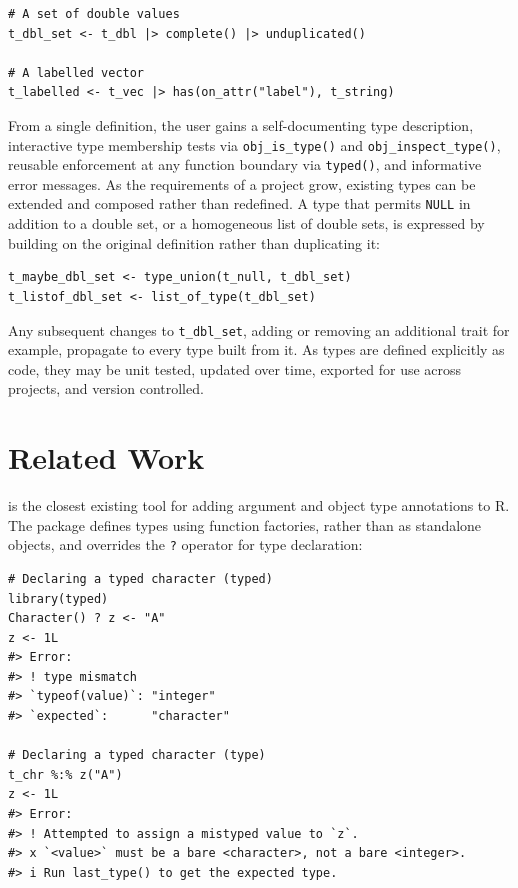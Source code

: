 \begin{verbatim}
# A set of double values
t_dbl_set <- t_dbl |> complete() |> unduplicated()

# A labelled vector
t_labelled <- t_vec |> has(on_attr("label"), t_string)
\end{verbatim}

From a single definition, the user gains a self-documenting type description, interactive type membership tests via \texttt{obj\_is\_type()} and \texttt{obj\_inspect\_type()}, reusable enforcement at any function boundary via \texttt{typed()}, and informative error messages. As the requirements of a project grow, existing types can be extended and composed rather than redefined. A type that permits \texttt{NULL} in addition to a double set, or a homogeneous list of double sets, is expressed by building on the original definition rather than duplicating it:

\begin{verbatim}
t_maybe_dbl_set <- type_union(t_null, t_dbl_set)
t_listof_dbl_set <- list_of_type(t_dbl_set)
\end{verbatim}

Any subsequent changes to \texttt{t\_dbl\_set}, adding or removing an additional trait for example, propagate to every type built from it. As types are defined explicitly as code, they may be unit tested, updated over time, exported for use across projects, and version controlled.

\section{Related Work}\label{sec-related-work}

 \citep{typed} is the closest existing tool for adding argument and object type annotations to R. The package defines types using function factories, rather than as standalone objects, and overrides the \texttt{?} operator for type declaration:

\begin{verbatim}
# Declaring a typed character (typed)
library(typed)
Character() ? z <- "A"
z <- 1L
#> Error:
#> ! type mismatch
#> `typeof(value)`: "integer"  
#> `expected`:      "character"

# Declaring a typed character (type)
t_chr %:% z("A")
z <- 1L
#> Error:
#> ! Attempted to assign a mistyped value to `z`.
#> x `<value>` must be a bare <character>, not a bare <integer>.
#> i Run last_type() to get the expected type.
\end{verbatim}

